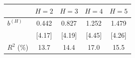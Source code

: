 \begin{tabular}{lcccc}
\toprule
 & $H=2$ & $H=3$ & $H=4$ & $H=5$ \\
\midrule
$b^{(H)}$ & 0.442 & 0.827 & 1.252 & 1.479 \\
 & [4.17] & [4.19] & [4.45] & [4.26] \\
$R^2$ (\%) & 13.7 & 14.4 & 17.0 & 15.5 \\
\bottomrule
\end{tabular}
